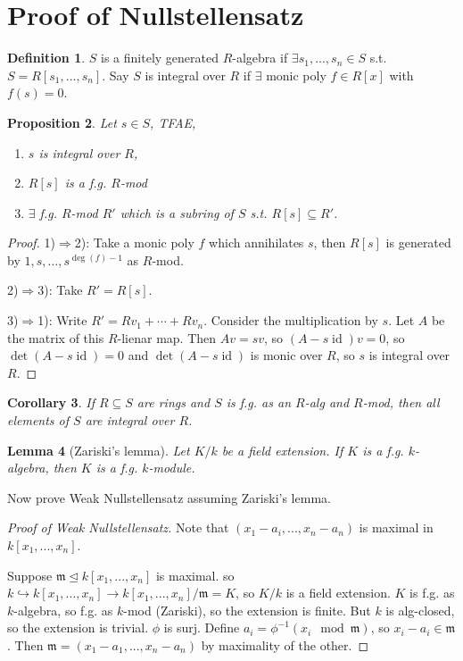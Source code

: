 \documentclass{article}
\theoremstyle{definition}
\newtheorem{defn}{Definition}[section]
\theoremstyle{remark}
\theoremstyle{plain}
\newtheorem{lem}[defn]{Lemma}
\newtheorem{prop}[defn]{Proposition}
\newtheorem{crly}[defn]{Corollary}
\newcommand{\id}{\operatorname{id}}
\begin{document}
\section{Proof of Nullstellensatz}
\begin{defn}
    $S$ is a finitely generated $R$-algebra if $\exists s_1,...,s_n\in S$ s.t. $S=R[s_1,...,s_n]$. Say $S$ is integral over $R$ if $\exists$ monic poly $f\in R[x]$ with $f(s)=0$.
\end{defn}
\begin{prop}
    Let $s\in S$, TFAE,
    \begin{enumerate}[1)]
        \item $s$ is integral over $R$,
        \item $R[s]$ is a f.g. $R$-mod
        \item $\exists$ f.g. $R$-mod $R'$ which is a subring of $S$ s.t. $R[s]\subseteq R'$.
    \end{enumerate}
\end{prop}
\begin{proof}
    1)$\Rightarrow$2): Take a monic poly $f$ which annihilates $s$, then $R[s]$ is generated by $1,s,...,s^{\deg (f)-1}$ as $R$-mod.

    2)$\Rightarrow$3): Take $R'=R[s]$.

    3)$\Rightarrow$1): Write $R'=Rv_1+\cdots+Rv_n$. Consider the multiplication by $s$. Let $A$ be the matrix of this $R$-lienar map. Then $Av=sv$, so $(A-s\id)v=0$, so $\det (A-s\id)=0$ and $\det (A-s\id)$ is monic over $R$, so $s$ is integral over $R$.
\end{proof}
\begin{crly}
    If $R\subseteq S$ are rings and $S$ is f.g. as an $R$-alg and $R$-mod, then all elements of $S$ are integral over $R$.
\end{crly}
\begin{lem}[Zariski's lemma]
    Let $K/k$ be a field extension. If $K$ is a f.g. $k$-algebra, then $K$ is a f.g. $k$-module.
\end{lem}
Now prove Weak Nullstellensatz assuming Zariski's lemma.
\begin{proof}[Proof of Weak Nullstellensatz]
    Note that $(x_1-a_i,...,x_n-a_n)$ is maximal in $k[x_1,...,x_n]$.

    Suppose $\mathfrak m\trianglelefteq k[x_1,...,x_n]$ is maximal. so $k\hookrightarrow k[x_1,...,x_n]\to k[x_1,...,x_n]/\mathfrak m=K$, so $K/k$ is a field extension. $K$ is f.g. as $k$-algebra, so f.g. as $k$-mod (Zariski), so the extension is finite. But $k$ is alg-closed, so the extension is trivial. $\phi$ is surj. Define $a_i=\phi^{-1}(x_i\mod \mathfrak m)$, so $x_i-a_i\in\mathfrak m$. Then $\mathfrak m=(x_1-a_1,...,x_n-a_n)$ by maximality of the other.
\end{proof}
\end{document}

